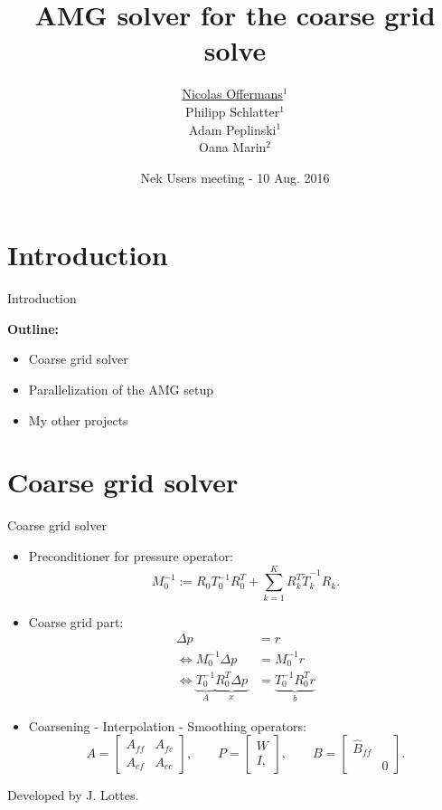 \documentclass[usenames,dvipsnames,svgnames,9pt]{beamer}
\title[AMG solver for the coarse grid solve] %
{
	AMG solver for the coarse grid solve %
}
\author[Nicolas Offermans] %
{
	\underline{Nicolas Offermans}$^1$ \\
	Philipp Schlatter$^1$ \\
	Adam Peplinski$^1$ \\
	Oana Marin$^2$
}
\institute[unused]
{
	$^1$Linn\'e FLOW Centre, KTH Mechanics \\
	$^2$Argonne National Laboratory
}
\date[unused]
	{Nek Users meeting - 10 Aug. 2016}
\begin{document}
\titleframe %


\section{Introduction}

\begin{frame}{Introduction}{}

\textbf{Outline:}

\begin{itemize}
\item Coarse grid solver
\vspace{5mm}
\item Parallelization of the AMG setup
\vspace{5mm}
\item My other projects
\end{itemize}

\end{frame}

\section{Coarse grid solver}

\begin{frame}{Coarse grid solver}{}

\begin{itemize}
\item Preconditioner for pressure operator: 
\begin{equation*}
M_0^{-1} := R_0 T_0^{-1} R_0^T + \sum_{k=1}^{K} R_k^T \tilde{T}_k^{-1} R_k.
\end{equation*}

\item Coarse grid part:
\begin{align*}
\Delta p & = r \\
\Leftrightarrow M_0^{-1} \Delta p & = M_0^{-1}r \\
\Leftrightarrow \underbrace{T_0^{-1}}_{A} \underbrace{R_0^T \Delta p}_{x} & = \underbrace{T_0^{-1} R_0^T r}_{b}
\end{align*}

\item Coarsening - Interpolation - Smoothing operators:
\begin{equation*}
 A = 
 \begin{bmatrix}
  A_{ff} & A_{fc} \\
  A_{cf} & A_{cc}
 \end{bmatrix}, \qquad
 P = 
 \begin{bmatrix}
  W \\
  I,
 \end{bmatrix}, \qquad
 B = 
 \begin{bmatrix}
  \hat{B}_{ff} &  \\
   & 0
 \end{bmatrix}.
\end{equation*}
\end{itemize}

Developed by J. Lottes.

\end{frame}
\end{document}

